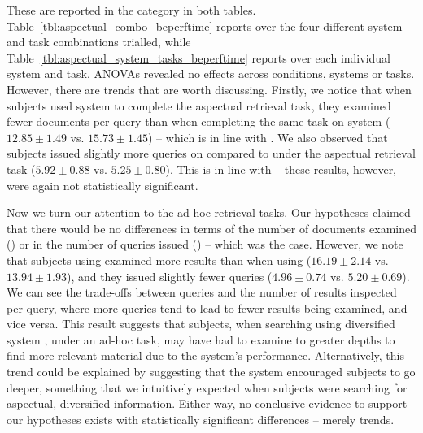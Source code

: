 These are reported in the  category in both tables. Table~\ref{tbl:aspectual_combo_beperftime} reports over the four different system and task combinations trialled, while Table~\ref{tbl:aspectual_system_tasks_beperftime} reports over each individual system and task. ANOVAs revealed no effects across conditions, systems or tasks. However, there are trends that are worth discussing. Firstly, we notice that when subjects used system  to complete the aspectual retrieval task, they examined fewer documents per query than when completing the same task on system  ($12.85\pm1.49$ vs. $15.73\pm1.45$) -- which is in line with . We also observed that subjects issued slightly more queries on  compared to  under the aspectual retrieval task ($5.92\pm0.88$ vs. $5.25\pm0.80$). This is in line with  -- these results, however, were again not statistically significant.

\vspace*{-1mm}
Now we turn our attention to the ad-hoc retrieval tasks. Our hypotheses claimed that there would be no differences in terms of the number of documents examined () or in the number of queries issued () -- which was the case. However, we note that subjects using  examined more results than when using  ($16.19\pm2.14$ vs. $13.94\pm1.93$), and they issued slightly fewer queries ($4.96\pm0.74$ vs. $5.20\pm0.69$). We can see the trade-offs between queries and the number of results inspected per query, where more queries tend to lead to fewer results being examined, and vice versa. This result suggests that subjects, when searching using diversified system , under an ad-hoc task, may have had to examine to greater depths to find more relevant material due to the system's performance. Alternatively, this trend could be explained by suggesting that the system encouraged subjects to go deeper, something that we intuitively expected when subjects were searching for aspectual, diversified information. Either way, no conclusive evidence to support our hypotheses exists with statistically significant differences -- merely trends.


